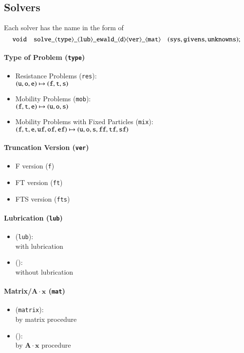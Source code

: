 \documentclass{book}
\begin{document}
\subsection{Solvers}
Each solver has the name in the form of
\begin{equation}
  {\tt void\quad solve\_\langle type\rangle\_\langle lub\rangle\_ewald\_\langle d\rangle\langle ver\rangle\_\langle mat\rangle\quad(sys, givens, unknowns);}
\end{equation}

\paragraph{Type of Problem ({\tt type})}
\begin{itemize}
\item Resistance Problems ({\tt res}):\\
  $({\tt u, o, e}) \mapsto ({\tt f, t, s})$
\item Mobility Problems ({\tt mob}):\\
  $({\tt f, t, e}) \mapsto ({\tt u, o, s})$
\item Mobility Problems with Fixed Particles ({\tt mix}):\\
  $({\tt f, t, e, uf, of, ef}) \mapsto ({\tt u, o, s, ff, tf, sf})$
\end{itemize}

\paragraph{Truncation Version ({\tt ver})}
\begin{itemize}
\item F version ({\tt f})
\item FT version ({\tt ft})
\item FTS version ({\tt fts})
\end{itemize}

\paragraph{Lubrication ({\tt lub})}
\begin{itemize}
\item ({\tt lub}):\\
  with lubrication
\item ():\\
  without lubrication
\end{itemize}

\paragraph{Matrix/$\bm{A}\cdot\bm{x}$ ({\tt mat})}
\begin{itemize}
\item ({\tt matrix}):\\
  by matrix procedure
\item ():\\
  by $\bm{A}\cdot\bm{x}$ procedure
\end{itemize}
\end{document}
